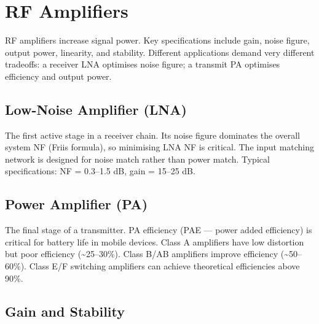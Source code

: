 \section{RF Amplifiers}\label{sec:wiki_amplifiers}



RF amplifiers increase signal power. Key specifications include gain, noise figure, output power, linearity, and stability. Different applications demand very different tradeoffs: a receiver LNA optimises noise figure; a transmit PA optimises efficiency and output power.

				

\subsection{Low-Noise Amplifier (LNA)}

				


				

The first active stage in a receiver chain. Its noise figure dominates the overall system NF (Friis formula), so minimising LNA NF is critical. The input matching network is designed for noise match rather than power match. Typical specifications: NF = 0.3–1.5 dB, gain = 15–25 dB.


				

\subsection{Power Amplifier (PA)}

				

The final stage of a transmitter. PA efficiency (PAE — power added efficiency) is critical for battery life in mobile devices. Class A amplifiers have low distortion but poor efficiency (\textasciitilde{}25–30\%). Class B/AB amplifiers improve efficiency (\textasciitilde{}50–60\%). Class E/F switching amplifiers can achieve theoretical efficiencies above 90\%.

				

\subsection{Gain and Stability}

